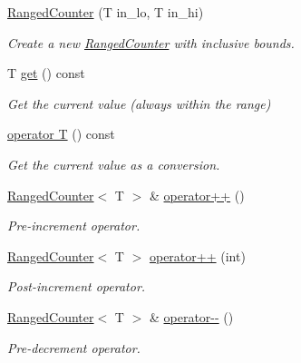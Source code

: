 \begin{DoxyCompactItemize}
\item 
\hyperlink{structvt_1_1util_1_1adt_1_1_ranged_counter_a79f36854b9087560af86d9922c16976a}{Ranged\+Counter} (T in\+\_\+lo, T in\+\_\+hi)
\begin{DoxyCompactList}\small\item\em Create a new {\ttfamily \hyperlink{structvt_1_1util_1_1adt_1_1_ranged_counter}{Ranged\+Counter}} with inclusive bounds. \end{DoxyCompactList}\item 
T \hyperlink{structvt_1_1util_1_1adt_1_1_ranged_counter_a1cb23d5e9a3394ce6c2aac36aa6bb744}{get} () const
\begin{DoxyCompactList}\small\item\em Get the current value (always within the range) \end{DoxyCompactList}\item 
\hyperlink{structvt_1_1util_1_1adt_1_1_ranged_counter_a498b9085058b66b12733dc40fe20b17a}{operator T} () const
\begin{DoxyCompactList}\small\item\em Get the current value as a conversion. \end{DoxyCompactList}\item 
\hyperlink{structvt_1_1util_1_1adt_1_1_ranged_counter}{Ranged\+Counter}$<$ T $>$ \& \hyperlink{structvt_1_1util_1_1adt_1_1_ranged_counter_a41f5e2ae9bdb7b47adc3e70214e26063}{operator++} ()
\begin{DoxyCompactList}\small\item\em Pre-\/increment operator. \end{DoxyCompactList}\item 
\hyperlink{structvt_1_1util_1_1adt_1_1_ranged_counter}{Ranged\+Counter}$<$ T $>$ \hyperlink{structvt_1_1util_1_1adt_1_1_ranged_counter_a38c5ea2a20d736897f2f4f76d211bdf8}{operator++} (int)
\begin{DoxyCompactList}\small\item\em Post-\/increment operator. \end{DoxyCompactList}\item 
\hyperlink{structvt_1_1util_1_1adt_1_1_ranged_counter}{Ranged\+Counter}$<$ T $>$ \& \hyperlink{structvt_1_1util_1_1adt_1_1_ranged_counter_a2b63f02efaf2327c2dbc34b5c1472625}{operator-\/-\/} ()
\begin{DoxyCompactList}\small\item\em Pre-\/decrement operator. \end{DoxyCompactList}\item 

\end{DoxyCompactItemize}
